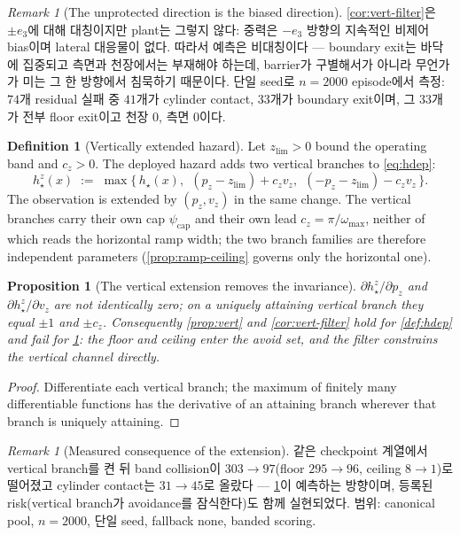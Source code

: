 \documentclass[11pt]{article}
\theoremstyle{plain}
\newtheorem{proposition}[theorem]{Proposition}
\theoremstyle{definition}
\newtheorem{definition}[theorem]{Definition}
\theoremstyle{remark}
\newtheorem{remark}[theorem]{Remark}
\newcommand{\eqdef}{:=}
\begin{document}
\begin{remark}[The unprotected direction is the biased direction]\label{rem:gravity}
\cref{cor:vert-filter}은 $\pm e_3$에 대해 대칭이지만 plant는 그렇지 않다: 중력은 $-e_3$ 방향의
지속적인 비제어 bias이며 lateral 대응물이 없다. 따라서 예측은 비대칭이다 --- boundary exit는 바닥에
집중되고 측면과 천장에서는 부재해야 하는데, barrier가 구별해서가 아니라 무언가가 미는 그 한
방향에서 침묵하기 때문이다. 단일 seed로 $n=2000$ episode에서 측정: $74$개 residual 실패 중 $41$개가
cylinder contact, $33$개가 boundary exit이며, 그 $33$개가 전부 floor exit이고 천장 $0$, 측면
$0$이다.
\end{remark}

\begin{definition}[Vertically extended hazard]\label{def:hband}
Let $z_{\mathrm{lim}}>0$ bound the operating band and $c_z>0$. The deployed hazard adds two
vertical branches to \cref{eq:hdep}:
\begin{equation}\label{eq:hband}
h_\star^{z}(x)\;\eqdef\;\max\Big\{\,h_\star(x),\ \ (p_z-z_{\mathrm{lim}})+c_z v_z,\ \
(-p_z-z_{\mathrm{lim}})-c_z v_z\,\Big\}.
\end{equation}
The observation is extended by $(p_z,v_z)$ in the same change. The vertical branches carry their
own cap $\psi_{\mathrm{cap}}$ and their own lead $c_z=\pi/\omega_{\max}$, neither of which reads
the horizontal ramp width; the two branch families are therefore independent parameters
(\cref{prop:ramp-ceiling} governs only the horizontal one).
\end{definition}

\begin{proposition}[The vertical extension removes the invariance]\label{prop:vert-removed}
$\partial h_\star^{z}/\partial p_z$ and $\partial h_\star^{z}/\partial v_z$ are not identically
zero; on a uniquely attaining vertical branch they equal $\pm1$ and $\pm c_z$. Consequently
\cref{prop:vert} and \cref{cor:vert-filter} hold for \cref{def:hdep} and fail for
\cref{def:hband}: the floor and ceiling enter the avoid set, and the filter constrains the
vertical channel directly.
\end{proposition}
\begin{proof}
Differentiate each vertical branch; the maximum of finitely many differentiable functions has
the derivative of an attaining branch wherever that branch is uniquely attaining.
\end{proof}

\begin{remark}[Measured consequence of the extension]\label{rem:band-measured}
같은 checkpoint 계열에서 vertical branch를 켠 뒤 band collision이 $303\to97$(floor $295\to96$,
ceiling $8\to1$)로 떨어졌고 cylinder contact는 $31\to45$로 올랐다 --- \cref{prop:vert-removed}이
예측하는 방향이며, 등록된 risk(vertical branch가 avoidance를 잠식한다)도 함께 실현되었다. 범위:
canonical pool, $n=2000$, 단일 seed, fallback none, banded scoring.
\end{remark}
\end{document}
